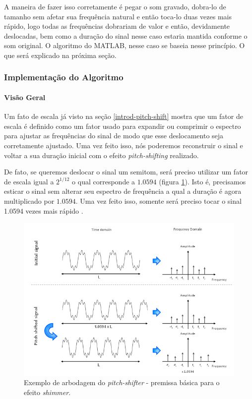 			A maneira de fazer isso corretamente é pegar o som gravado, dobra-lo de tamanho sem afetar sua frequência natural e então toca-lo duas vezes mais rápido, logo todas as frequências dobrariam de valor e então, devidamente deslocadas, bem como a duração do sinal nesse caso estaria mantida conforme o som original. O algoritmo do MATLAB, nesse caso se baseia nesse princípio. O que será explicado na próxima seção.
			
		\subsubsection{Implementação do Algoritmo}
			\paragraph{Visão Geral}		
				
				Um fato de escala já visto na seção \ref{introd-pitch-shift} mostra que um fator de escala é definido como um fator usado para expandir ou comprimir o espectro para ajustar as frequências do sinal de modo que esse deslocamento seja corretamente ajustado. Uma vez feito isso, nós poderemos reconstruir o sinal e voltar a sua duração inicial com o efeito \textit{pitch-shifting} realizado.
				
				De fato, se queremos deslocar o sinal um semitom, será preciso utilizar um fator de escala igual a $2^{1/12}$ o qual corresponde a $1.0594$ (figura \ref{fig-pitch-shifter-exem01}). Isto é, precisamos esticar o sinal sem alterar seu espectro de frequência a qual a duração é agora multiplicado por $1.0594$. Uma vez feito isso, somente será preciso tocar o sinal 1.0594 vezes mais rápido \cite{Demers2009}.
				
				\begin{figure}[!ht]
					\centering
					\includegraphics[scale=0.5]{./figuras/pitch-shifter-exem1.PNG}
					\caption{Exemplo de arbodagem do \textit{pitch-shifter} - premissa básica para o efeito \textit{shimmer}.}
					\label{fig-pitch-shifter-exem01}
				\end{figure}
				
